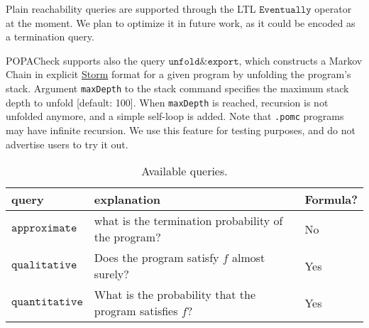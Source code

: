\documentclass[9pt,a4paper]{article}
\begin{document}
Plain reachability queries are supported through the LTL $\texttt{Eventually}$ operator at the moment. We plan to optimize it in future work, as it could be encoded as a termination query. 

POPACheck supports also the query $\texttt{unfold\&export}$, which constructs a Markov Chain in explicit \href{https://www.stormchecker.org/documentation/background/languages.html}{Storm} format for a given program by unfolding the program's stack. Argument \verb|maxDepth| to the stack command specifies the maximum stack depth to unfold [default: 100]. When \verb|maxDepth| is reached, recursion is not unfolded anymore, and a simple self-loop is added. Note that \verb|.pomc| programs may have infinite recursion. We use this feature for testing purposes, and do not advertise users to try it out.

\begin{table}
\centering
\begin{tabular}{| l | l | l |}
\hline
 query & explanation & Formula? \\
\hline
\hline
$\texttt{approximate}$ & what is the termination probability of the program? & No \\ 
$\texttt{qualitative}$ & Does the program satisfy $f$ almost surely? & Yes \\ 
$\texttt{quantitative}$ & What is the probability that the program satisfies $f$? & Yes \\ 


\hline
\end{tabular}
\caption{Available queries.}
\label{tab:queries}
\end{table}
\end{document}
